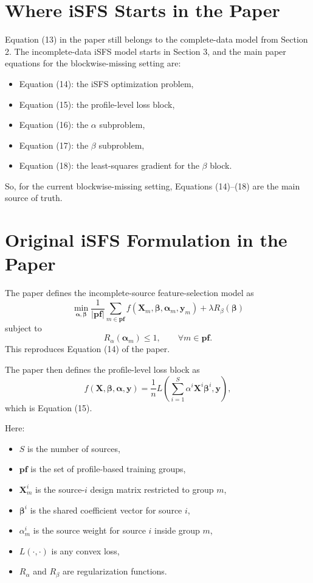 \documentclass[11pt]{article}
\newcommand{\pf}{\mathbf{pf}}
\newcommand{\Xm}{\mathbf{X}_m}
\newcommand{\ym}{\mathbf{y}_m}
\newcommand{\alpham}{\boldsymbol{\alpha}_m}
\newcommand{\betai}{\boldsymbol{\beta}^i}
\newcommand{\betavec}{\boldsymbol{\beta}}
\newcommand{\alphavec}{\boldsymbol{\alpha}}
\begin{document}
\section{Where iSFS Starts in the Paper}

Equation (13) in the paper still belongs to the complete-data model from
Section 2. The incomplete-data iSFS model starts in Section 3, and the main
paper equations for the blockwise-missing setting are:

\begin{itemize}
  \item Equation (14): the iSFS optimization problem,
  \item Equation (15): the profile-level loss block,
  \item Equation (16): the $\alpha$ subproblem,
  \item Equation (17): the $\beta$ subproblem,
  \item Equation (18): the least-squares gradient for the $\beta$ block.
\end{itemize}

So, for the current blockwise-missing setting, Equations (14)--(18) are the
main source of truth.

\section{Original iSFS Formulation in the Paper}

The paper defines the incomplete-source feature-selection model as
\begin{equation}
\label{eq:paper14}
\min_{\alphavec, \betavec}
\frac{1}{|\pf|}
\sum_{m \in \pf}
f(\Xm, \betavec, \alpham, \ym)
 + \lambda R_{\beta}(\betavec)
\end{equation}
subject to
\begin{equation}
\label{eq:paper14-constraint}
R_{\alpha}(\alpham) \le 1,
\qquad \forall m \in \pf.
\end{equation}
This reproduces Equation (14) of the paper.

The paper then defines the profile-level loss block as
\begin{equation}
\label{eq:paper15}
f(\mathbf{X}, \betavec, \alphavec, \mathbf{y})
=
\frac{1}{n}
L\!\left(
\sum_{i=1}^{S} \alpha^i \mathbf{X}^i \betai,
\mathbf{y}
\right),
\end{equation}
which is Equation (15).

Here:
\begin{itemize}
  \item $S$ is the number of sources,
  \item $\pf$ is the set of profile-based training groups,
  \item $\Xm^i$ is the source-$i$ design matrix restricted to group $m$,
  \item $\betai$ is the shared coefficient vector for source $i$,
  \item $\alpha_m^i$ is the source weight for source $i$ inside group $m$,
  \item $L(\cdot,\cdot)$ is any convex loss,
  \item $R_{\alpha}$ and $R_{\beta}$ are regularization functions.
\end{itemize}
\end{document}
